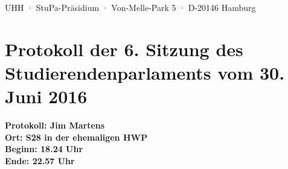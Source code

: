 \documentclass[ngerman,headheight=70pt]{scrartcl}
\begin{document}
    UHH · StuPa-Präsidium · Von-Melle-Park 5 · D-20146 Hamburg

    \section*{Protokoll der 6. Sitzung des Studierendenparlaments vom 30. Juni 2016}

    \textbf{Protokoll: Jim Martens}\\
    \textbf{Ort: S28 in der ehemaligen HWP}\\
    \textbf{Beginn: 18.24 Uhr}\\
    \textbf{Ende: 22.57 Uhr}

    \vspace{0.5cm}
\end{document}
